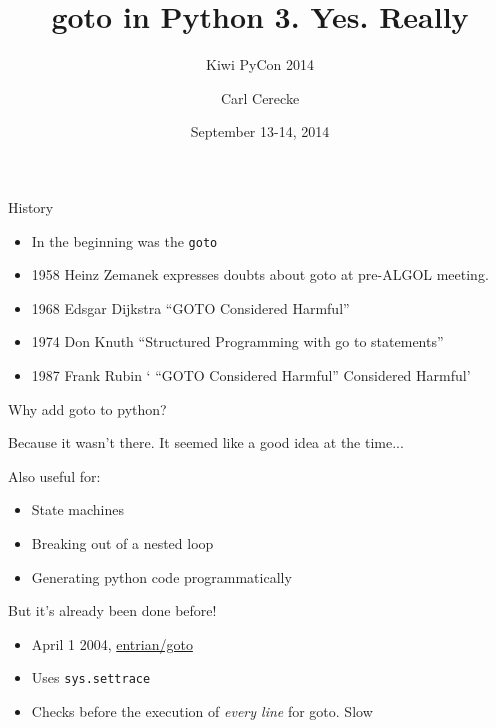 \documentclass{beamer}
\title{goto in Python 3. Yes. Really}
\subtitle{Kiwi PyCon 2014}
\author{Carl Cerecke}
\institute{https://github.com/cdjc/goto}
\date{September 13-14, 2014}
\begin{document}
    \begin{frame}[plain]
        \titlepage
    \end{frame}

\begin{frame}{History}

\begin{itemize}
\item In the beginning was the \texttt{goto}
\item 1958 Heinz Zemanek expresses doubts about goto at pre-ALGOL meeting.
\item 1968 Edsgar Dijkstra ``GOTO Considered Harmful''
\item 1974 Don Knuth ``Structured Programming with go to statements''
\item 1987 Frank Rubin ` ``GOTO Considered Harmful'' Considered Harmful'
\end{itemize}

\end{frame}

\begin{frame}{Why add goto to python?}

Because it wasn't there. It seemed like a good idea at the time...
\vspace{1cm}

Also useful for:
\begin{itemize}
\item State machines
\item Breaking out of a nested loop
\item Generating python code programmatically
\end{itemize}

\end{frame}

\begin{frame}{But it's already been done before!}

\begin{itemize}
\item April 1 2004, \href{http://entrian/goto}{entrian/goto}

\item Uses \texttt{sys.settrace}

\item Checks before the execution of \emph{every line} for goto. Slow
\end{itemize}
\end{frame}
\end{document}
